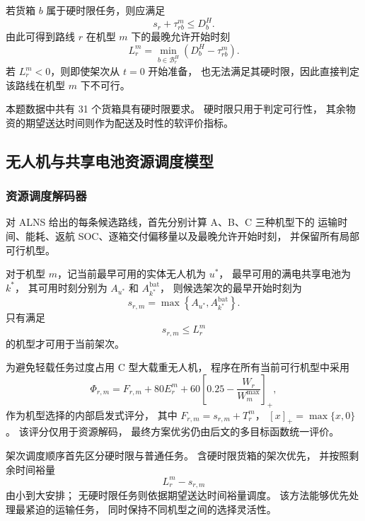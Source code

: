 若货箱 $b$ 属于硬时限任务，则应满足
\begin{equation}
	s_r+\tau_{rb}^{m}\le D_b^{H}.
	\label{eq:q2-hard-constraint}
\end{equation}
由此可得到路线 $r$ 在机型 $m$ 下的最晚允许开始时刻
\begin{equation}
	L_r^m
	=
	\min_{b\in\mathcal{B}_r^{H}}
	\left(
	D_b^H-\tau_{rb}^{m}
	\right).
	\label{eq:q2-latest-start}
\end{equation}
若 $L_r^m<0$，则即使架次从 $t=0$ 开始准备，
也无法满足其硬时限，因此直接判定该路线在机型 $m$ 下不可行。

本题数据中共有 31 个货箱具有硬时限要求。
硬时限只用于判定可行性，
其余物资的期望送达时间则作为配送及时性的软评价指标。

\subsection{无人机与共享电池资源调度模型}

\subsubsection{资源调度解码器}

对 ALNS 给出的每条候选路线，首先分别计算 A、B、C 三种机型下的
运输时间、能耗、返航 SOC、逐箱交付偏移量以及最晚允许开始时刻，
并保留所有局部可行机型。

对于机型 $m$，记当前最早可用的实体无人机为 $u^*$，
最早可用的满电共享电池为 $k^*$，
其可用时刻分别为 $A_{u^*}$ 和 $A_{k^*}^{\mathrm{bat}}$，
则候选架次的最早开始时刻为
\begin{equation}
	s_{r,m}
	=
	\max\left\{
	A_{u^*},
	A_{k^*}^{\mathrm{bat}}
	\right\}.
	\label{eq:q2-earliest-start}
\end{equation}
只有满足
\[
s_{r,m}\le L_r^m
\]
的机型才可用于当前架次。

为避免轻载任务过度占用 C 型大载重无人机，
程序在所有当前可行机型中采用
\begin{equation}
	\Phi_{r,m}
	=
	F_{r,m}
	+80E_r^m
	+60\left[0.25-\frac{W_r}{W_m^{\max}}\right]_+,
	\label{eq:q2-type-score}
\end{equation}
作为机型选择的内部启发式评分，
其中 $F_{r,m}=s_{r,m}+T_r^m$，
$[x]_+=\max\{x,0\}$。
该评分仅用于资源解码，
最终方案优劣仍由后文的多目标函数统一评价。

架次调度顺序首先区分硬时限与普通任务。
含硬时限货箱的架次优先，
并按照剩余时间裕量
\[
L_r^m-s_{r,m}
\]
由小到大安排；
无硬时限任务则依据期望送达时间裕量调度。
该方法能够优先处理最紧迫的运输任务，
同时保持不同机型之间的选择灵活性。

